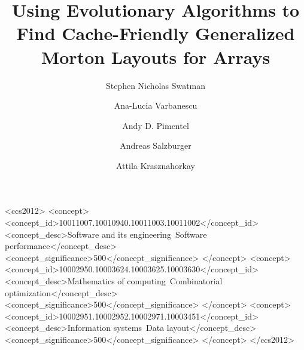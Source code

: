 \title{Using Evolutionary Algorithms to Find Cache-Friendly Generalized Morton Layouts for Arrays}


\author{Stephen Nicholas Swatman}

\author{Ana-Lucia Varbanescu}

\author{Andy D. Pimentel}

\author{Andreas Salzburger}

\author{Attila Krasznahorkay}

\begin{CCSXML}
<ccs2012>
<concept>
<concept_id>10011007.10010940.10011003.10011002</concept_id>
<concept_desc>Software and its engineering~Software performance</concept_desc>
<concept_significance>500</concept_significance>
</concept>
<concept>
<concept_id>10002950.10003624.10003625.10003630</concept_id>
<concept_desc>Mathematics of computing~Combinatorial optimization</concept_desc>
<concept_significance>500</concept_significance>
</concept>
<concept>
<concept_id>10002951.10002952.10002971.10003451</concept_id>
<concept_desc>Information systems~Data layout</concept_desc>
<concept_significance>500</concept_significance>
</concept>
</ccs2012>
\end{CCSXML}




